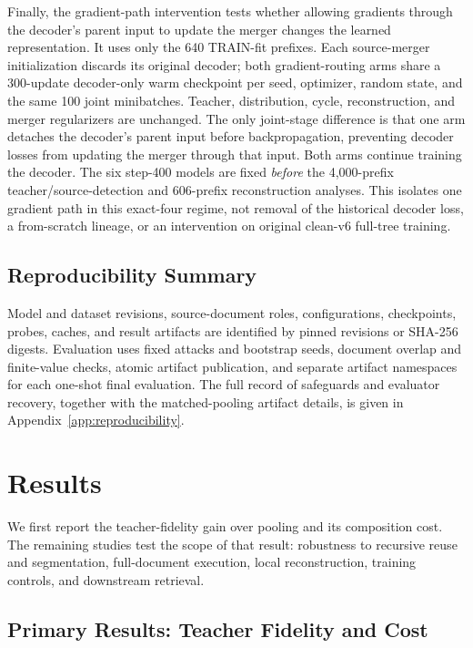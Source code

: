 \documentclass[10pt]{article}
\begin{document}
Finally, the gradient-path intervention tests whether allowing gradients
through the decoder's parent input to update the merger changes the learned
representation. It uses only the 640 TRAIN-fit prefixes. Each source-merger
initialization discards its original decoder;
both gradient-routing arms share a 300-update decoder-only warm checkpoint
per seed, optimizer, random state, and the same 100 joint minibatches. Teacher,
distribution, cycle, reconstruction, and merger regularizers are unchanged.
The only joint-stage difference is that one arm detaches the decoder's parent
input before backpropagation, preventing decoder losses from updating the merger
through that input. Both arms
continue training the decoder. The six step-400 models are fixed \emph{before}
the 4,000-prefix teacher/source-detection and 606-prefix reconstruction
analyses. This isolates one gradient path in this exact-four regime,
not removal of the historical decoder loss, a from-scratch lineage, or an
intervention on original clean-v6 full-tree training.

\subsection{Reproducibility Summary}

Model and dataset revisions, source-document roles, configurations, checkpoints,
probes, caches, and result artifacts are identified by pinned revisions or
SHA-256 digests. Evaluation uses fixed attacks and bootstrap seeds, document
overlap and finite-value checks, atomic artifact publication, and separate
artifact namespaces for each one-shot final evaluation. The full record of
safeguards and evaluator recovery, together with the matched-pooling artifact
details, is given in Appendix~\ref{app:reproducibility}.

\section{Results}
\label{sec:results}

We first report the teacher-fidelity gain over pooling and its composition
cost. The remaining studies test the scope of that result: robustness to
recursive reuse and segmentation, full-document execution, local
reconstruction, training controls, and downstream retrieval.

\subsection{Primary Results: Teacher Fidelity and Cost}
\label{sec:safe-results}
\end{document}
